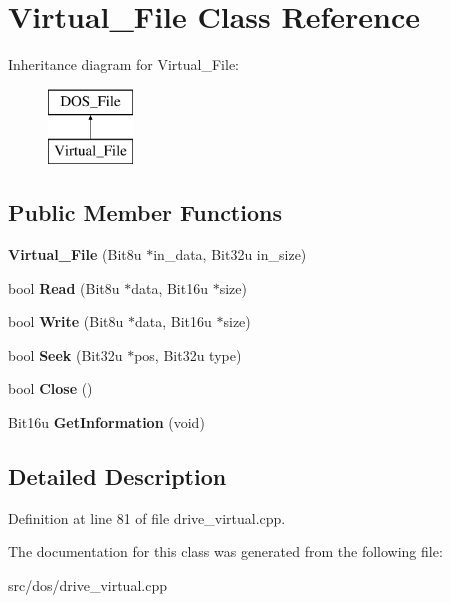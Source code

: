 \hypertarget{classVirtual__File}{\section{Virtual\-\_\-\-File Class Reference}
\label{classVirtual__File}
}
Inheritance diagram for Virtual\-\_\-\-File\-:\begin{figure}[H]
\begin{center}
\leavevmode
\includegraphics[height=2.000000cm]{classVirtual__File}
\end{center}
\end{figure}
\subsection*{Public Member Functions}
\begin{DoxyCompactItemize}
\item 
\hypertarget{classVirtual__File_a2cf61d572fa71337faaeb7df7392f317}{{\bfseries Virtual\-\_\-\-File} (Bit8u $\ast$in\-\_\-data, Bit32u in\-\_\-size)}\label{classVirtual__File_a2cf61d572fa71337faaeb7df7392f317}

\item 
\hypertarget{classVirtual__File_a1f0a1653d27e085f08eb73d6be4e1613}{bool {\bfseries Read} (Bit8u $\ast$data, Bit16u $\ast$size)}\label{classVirtual__File_a1f0a1653d27e085f08eb73d6be4e1613}

\item 
\hypertarget{classVirtual__File_a6e7ba663e804bcc3cf060f8ac16be42f}{bool {\bfseries Write} (Bit8u $\ast$data, Bit16u $\ast$size)}\label{classVirtual__File_a6e7ba663e804bcc3cf060f8ac16be42f}

\item 
\hypertarget{classVirtual__File_ab853373156d4989afa1d293ff604146c}{bool {\bfseries Seek} (Bit32u $\ast$pos, Bit32u type)}\label{classVirtual__File_ab853373156d4989afa1d293ff604146c}

\item 
\hypertarget{classVirtual__File_a75f40f36a91d8ba716cf9d9b60bd4454}{bool {\bfseries Close} ()}\label{classVirtual__File_a75f40f36a91d8ba716cf9d9b60bd4454}

\item 
\hypertarget{classVirtual__File_a32799e96fbb1e161825303ad7ffb2a16}{Bit16u {\bfseries Get\-Information} (void)}\label{classVirtual__File_a32799e96fbb1e161825303ad7ffb2a16}

\end{DoxyCompactItemize}


\subsection{Detailed Description}


Definition at line 81 of file drive\-\_\-virtual.\-cpp.



The documentation for this class was generated from the following file\-:\begin{DoxyCompactItemize}
\item 
src/dos/drive\-\_\-virtual.\-cpp\end{DoxyCompactItemize}
